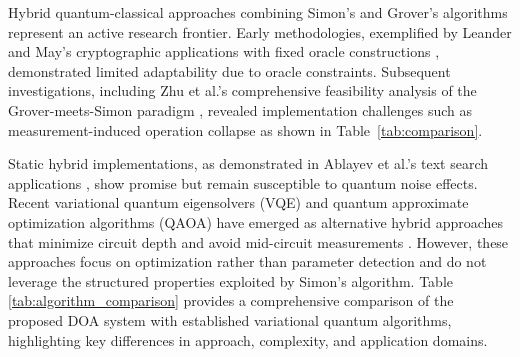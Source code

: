 \documentclass[journal]{IEEEtran}
\begin{document}
Hybrid quantum-classical approaches combining Simon's and Grover's algorithms represent an active research frontier. Early methodologies, exemplified by Leander and May's cryptographic applications with fixed oracle constructions \cite{10.1007/978-3-319-70697-9_6}, demonstrated limited adaptability due to oracle constraints. Subsequent investigations, including Zhu et al.'s comprehensive feasibility analysis of the Grover-meets-Simon paradigm \cite{zhu2023feasibilityanalysisgrovermeetssimonalgorithm}, revealed implementation challenges such as measurement-induced operation collapse as shown in Table~\ref{tab:comparison}.

\begin{table}[!t]
\centering
\caption{Comparison of DOA and "Grover Meets Simon" Approaches}
\label{tab:comparison}
\end{table}

Static hybrid implementations, as demonstrated in Ablayev et al.'s text search applications \cite{ablayev2023hybridclassicalquantumtextsearch}, show promise but remain susceptible to quantum noise effects. Recent variational quantum eigensolvers (VQE) and quantum approximate optimization algorithms (QAOA) have emerged as alternative hybrid approaches that minimize circuit depth and avoid mid-circuit measurements \cite{10590348, 10848114}. However, these approaches focus on optimization rather than parameter detection and do not leverage the structured properties exploited by Simon's algorithm.
Table \ref{tab:algorithm_comparison} provides a comprehensive comparison of the proposed DOA system with established variational quantum algorithms, highlighting key differences in approach, complexity, and application domains.
\end{document}
